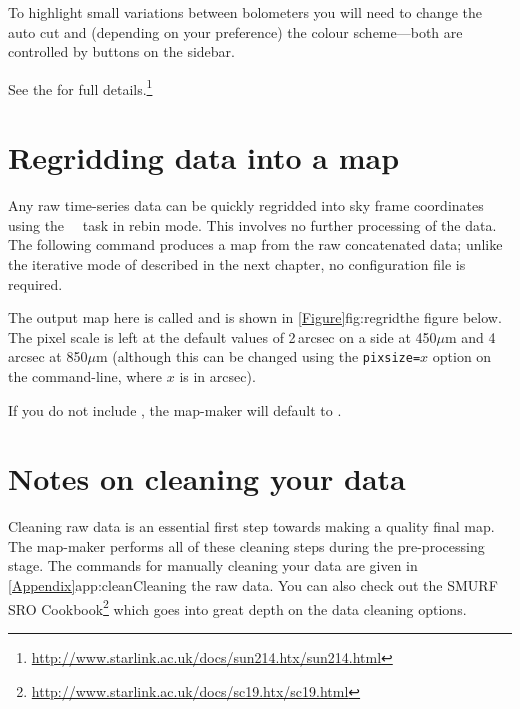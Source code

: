 To highlight small variations between bolometers you will need to
change the auto cut and (depending on your preference) the colour
scheme---both are controlled by buttons on the sidebar.

See the  for full
details.\footnote{\url{http://www.starlink.ac.uk/docs/sun214.htx/sun214.html}}


\section{Regridding data into a map}
\label{sec:regrid}

Any raw time-series data can be quickly regridded into sky frame
coordinates using the \smurf\ \makemap\ task in rebin mode. This
involves no further processing of the data. The following command produces
a map from the raw concatenated data; unlike the iterative mode of
 described in the next chapter, no configuration file is
required.

\begin{terminalv}
\end{terminalv}

The output map here is called  and is shown in
\cref{Figure}{fig:regrid}{the figure below}.  The pixel scale is left
at the default values of 2\,arcsec on a side at 450$\mu$m and
4\,arcsec at 850$\mu$m (although this can be changed using the
\texttt{pixsize=}$x$ option on the command-line, where $x$ is in
arcsec).


\begin{tip}
  If you do not include , the map-maker will
  default to .
\end{tip}


\section{Notes on cleaning your data}
\label{sec:clean}

Cleaning raw data is an essential first step towards making a quality
final map. The map-maker performs all of these cleaning steps during
the pre-processing stage. The commands for manually cleaning your data
are given in \cref{Appendix}{app:clean}{Cleaning the raw data}.  You
can also check out the SMURF SRO
Cookbook{\footnote{\url{http://www.starlink.ac.uk/docs/sc19.htx/sc19.html}}}
which goes into great depth on the data cleaning options.


